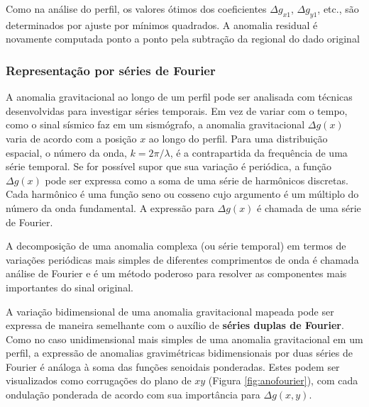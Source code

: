 \documentclass[]{book}
\theoremstyle{definition}
\theoremstyle{definition}
\theoremstyle{definition}
\theoremstyle{remark}
\begin{document}
Como na análise do perfil, os valores ótimos dos coeficientes \(\Delta g_{x1}\), \(\Delta g_{y1}\), etc., são determinados por ajuste por mínimos quadrados. A anomalia residual é novamente computada ponto a ponto pela subtração da regional do dado original

\hypertarget{representacao-por-series-de-fourier}{%
\subsubsection{Representação por séries de Fourier}\label{representacao-por-series-de-fourier}}

A anomalia gravitacional ao longo de um perfil pode ser analisada com técnicas desenvolvidas para investigar séries temporais. Em vez de variar com o tempo, como o sinal sísmico faz em um sismógrafo, a anomalia gravitacional \(\Delta g (x)\) varia de acordo com a posição \(x\) ao longo do perfil. Para uma distribuição espacial, o número da onda, \(k= 2\pi / \lambda\), é a contrapartida da frequência de uma série temporal. Se for possível supor que sua variação é periódica, a função \(\Delta g (x)\) pode ser expressa como a soma de uma série de harmônicos discretas. Cada harmônico é uma função \(\mathrm{seno}\) ou \(\mathrm{cosseno}\) cujo argumento é um múltiplo do número da onda fundamental. A expressão para \(\Delta g(x)\) é chamada de uma série de Fourier.

A decomposição de uma anomalia complexa (ou série temporal) em termos de variações periódicas mais simples de diferentes comprimentos de onda é chamada análise de Fourier e é um método poderoso para resolver as componentes mais importantes do sinal original.

A variação bidimensional de uma anomalia gravitacional mapeada pode ser expressa de maneira semelhante com o auxílio de \textbf{séries duplas de Fourier}. Como no caso unidimensional mais simples de uma anomalia gravitacional em um perfil, a expressão de anomalias gravimétricas bidimensionais por duas séries de Fourier é análoga à soma das funções senoidais ponderadas. Estes podem ser visualizados como corrugações do plano de \(xy\) (Figura \ref{fig:anofourier}), com cada ondulação ponderada de acordo com sua importância para \(\Delta g (x, y)\).
\end{document}
